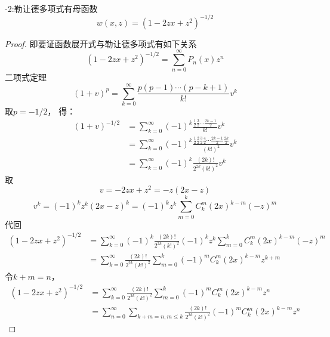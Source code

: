 	~~\\ 
	
	\begin{proposition}-2:勒让德多项式有母函数
		\begin{equation*}
			w(x, z)=\left(1-2 z x+z^{2}\right)^{-1 / 2}
		\end{equation*}	
	\end{proposition}
	\begin{proof}
		即要证函数展开式与勒让德多项式有如下关系
		\begin{equation*}
			\left(1-2 z x+z^{2}\right)^{-1 / 2}=\sum_{n=0}^{\infty} P_n(x) z^n
		\end{equation*}	
		二项式定理
		\begin{equation*}
			(1+v)^{p}=\sum_{k=0}^{\infty} \frac{p(p-1) \cdots(p-k+1)}{k !} v^{k}
		\end{equation*}	
		取$p=-1/2$， 得：
		\begin{align*}
			(1+v)^{-1/2}&=\sum_{k=0}^{\infty} (-1)^{k}\frac{\frac{1}{2}\frac{3}{2}  \cdots \frac{2k-1}{2}}{k !} v^{k}\\
			&=\sum_{k=0}^{\infty} (-1)^{k}\frac{\frac{1}{2}\frac{2}{2}\frac{3}{2} \frac{4}{2}  \cdots \frac{2k-1}{2}\frac{2k}{2}} {(k !)^2} v^{k}\\
			&=\sum_{k=0}^{\infty}(-1)^{k} \frac{(2 k) !}{2^{2 k}(k !)^{2}} v^{k}
		\end{align*}	
		取$$v=-2zx+z^2=-z(2x-z)$$ 
		\begin{equation*}
			v^{k}=(-1)^{k} z^{k}(2 x-z)^{k}=(-1)^{k} z^{k} \sum_{m=0}^{k} C_{k}^{m}(2 x)^{k-m}(-z)^{m}
		\end{equation*}	
		代回
		\begin{equation*}
		\begin{aligned}
		\left(1-2 z x+z^{2}\right)^{-{1}/{2}} &= \sum_{k=0}^{\infty}(-1)^{k} \frac{(2 k) !}{2^{2 k}(k !)^{2}} (-1)^{k} z^{k} \sum_{m=0}^{k} C_{k}^{m}(2 x)^{k-m}(-z)^{m}\\
		&=\sum_{k=0}^{\infty} \frac{(2 k) !}{2^{2 k}(k !)^{2}} \sum_{m=0}^{k}(-1)^{m} C_{k}^{m}(2 x)^{k-m} z^{k+m}
		\end{aligned}
		\end{equation*}	
		令$k+m=n$，
		\begin{equation*}
		\begin{split}
			\left(1-2 z x+z^{2}\right)^{-{1}/{2}} &= \sum_{k=0}^{\infty} \frac{(2 k) !}{2^{2 k}(k !)^{2}} \sum_{m=0}^{k}(-1)^{m} C_{k}^{m}(2 x)^{k-m} z^{n} \\
			&= \sum_{n=0}^{\infty}\sum_{k+m=n, m\le k} \frac{(2 k) !}{2^{2 k}(k !)^{2}}  (-1)^{m} C_{k}^{m}(2 x)^{k-m} z^{n}

\end{split}
\end{equation*}
\end{proof}

